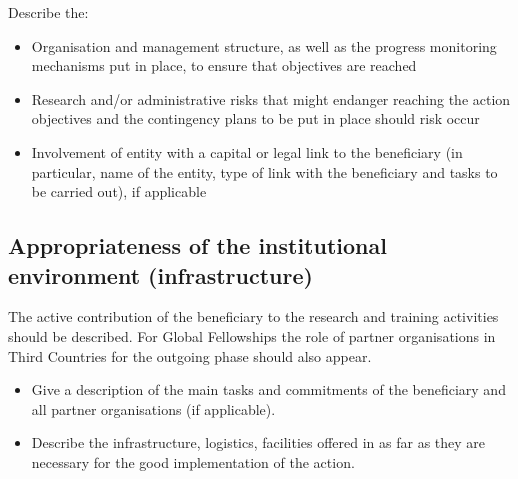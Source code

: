 Describe the:
\begin{itemize}
  \item Organisation and management structure, as well as the
  progress monitoring mechanisms put in place, to ensure that
  objectives are reached
  \item Research and/or administrative risks that might endanger
  reaching the action objectives and the contingency plans to be
  put in place should risk occur
  \item Involvement of entity with a capital or legal link to the
  beneficiary (in particular, name of the entity, type of link
  with the beneficiary and tasks to be carried out), if applicable
\end{itemize}


\subsection{Appropriateness of the institutional environment
(infrastructure)}
\label{sec:implementation_infrastructure}

The active contribution of the beneficiary to the research and
training activities should be described. For Global Fellowships
the role of partner organisations in Third Countries for the
outgoing phase should also appear. 

\begin{itemize}
  \item Give a description of the main tasks and commitments of
  the beneficiary and all partner organisations (if applicable).
  \item Describe the infrastructure, logistics, facilities offered
  in as far as they are necessary for the good implementation of
  the action.
\end{itemize}

\markEndPageLimit
